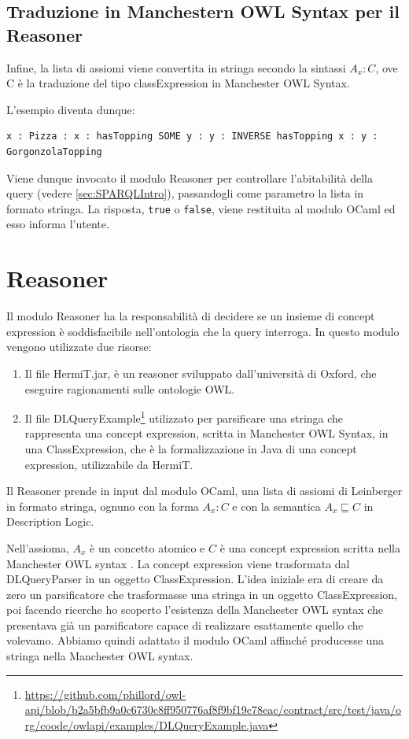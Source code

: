 \subsection{Traduzione in Manchestern OWL Syntax per il Reasoner}
Infine, la lista di assiomi viene convertita in stringa secondo la sintassi \(A_{x} : C\), ove C è la traduzione del tipo classExpression in Manchester OWL Syntax.

L'esempio diventa dunque:
\begin{verbatim}
x : Pizza : x : hasTopping SOME y : y : INVERSE hasTopping x : y : GorgonzolaTopping
\end{verbatim}
Viene dunque invocato il modulo Reasoner per controllare l'abitabilità della query (vedere \autoref{sec:SPARQLIntro}), passandogli come parametro la lista in formato stringa. La risposta, \texttt{true} o \texttt{false}, viene restituita al modulo OCaml ed esso informa l'utente.

\section{Reasoner}
Il modulo Reasoner ha la responsabilità di decidere se un insieme di concept expression è soddisfacibile nell'ontologia che la query interroga. In questo modulo vengono utilizzate due risorse:
\begin{enumerate}
    \item Il file HermiT.jar\cite{HermiTWhitepaper}, è un reasoner sviluppato dall'università di Oxford, che eseguire ragionamenti sulle ontologie OWL.
    \item Il file DLQueryExample\footnote{\url{https://github.com/phillord/owl-api/blob/b2a5bfb9a0c6730c8ff950776af8f9bf19c78eac/contract/src/test/java/org/coode/owlapi/examples/DLQueryExample.java}} utilizzato per parsificare una stringa che rappresenta una concept expression, scritta in Manchester OWL Syntax, in una ClassExpression, che è la formalizzazione in Java di una concept expression, utilizzabile da HermiT.
\end{enumerate}

Il Reasoner prende in input dal modulo OCaml, una lista di assiomi di Leinberger in formato stringa, ognuno con la forma \(A_{x} : C\) e con la semantica \( A_{x}\sqsubseteq C \) in Description Logic.

Nell'assioma, \(A_{x}\) è un concetto atomico e \(C\) è una concept expression scritta nella Manchester OWL syntax \cite{ManchesterOWLSyntax}. La concept expression viene trasformata dal DLQueryParser in un oggetto ClassExpression. L'idea iniziale era di creare da zero un parsificatore che trasformasse una stringa in un oggetto ClassExpression, poi facendo ricerche ho scoperto l'esistenza della Manchester OWL syntax che presentava già un parsificatore capace di realizzare esattamente quello che volevamo. Abbiamo quindi adattato il modulo OCaml affinché producesse una stringa nella Manchester OWL syntax.

